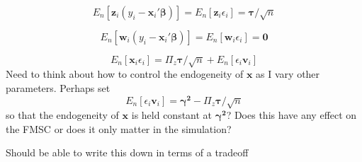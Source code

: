 \documentclass[12pt]{article}
\theoremstyle{definition}
\begin{document}
$$E_n[\mathbf{z}_i(y_i - \mathbf{x}_i' \boldsymbol{\beta})] = E_n[\mathbf{z}_i\epsilon_i] = \boldsymbol{\tau}/\sqrt{n}$$

$$E_n[\mathbf{w}_i (y_i - \mathbf{x}_i' \boldsymbol{\beta})]= E_n[\mathbf{w}_i\epsilon_i] = \mathbf{0}$$

$$E_n[\mathbf{x}_i \epsilon_i] = \Pi_z \boldsymbol{\tau}/\sqrt{n} + E_n[\epsilon_i \mathbf{v}_i]$$
Need to think about how to control the endogeneity of $\mathbf{x}$ as I vary other parameters. Perhaps set
  $$E_n[\epsilon_i \mathbf{v}_i] = \boldsymbol{\gamma^2} - \Pi_z \boldsymbol{\tau}/\sqrt{n}$$ so that the endogeneity of $\mathbf{x}$ is held constant at $\boldsymbol{\gamma^2}$? Does this have any effect on the FMSC or does it only matter in the simulation?
  
  Should be able to write this down in terms of a tradeoff 
\end{document}
